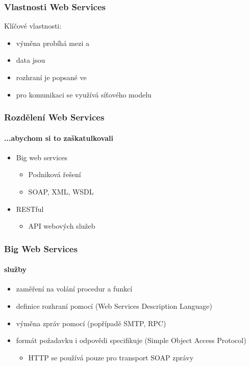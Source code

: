 \documentclass[12pt]{beamer}
\begin{document}
\begin{frame}
  \frametitle{Vlastnosti Web Services}

  \begin{block}{Klíčové vlastnosti:}
    \begin{itemize}
      \item výměna probíhá mezi  a 
      \item data jsou 
      \item rozhraní je popsané ve 
      \item pro komunikaci se využívá  síťového modelu
    \end{itemize}
  \end{block}
\end{frame}

\begin{frame}
  \frametitle{Rozdělení Web Services}
  \framesubtitle{...abychom si to zaškatulkovali}
	\begin{itemize}
      \item {\LARGE Big web services}
		\begin{itemize}
			\item Podniková řešení
			\item SOAP, XML, WSDL
		\end{itemize}
      \vspace{1cm}
      \item {\LARGE RESTful}
		\begin{itemize}
			\item API webových služeb
		\end{itemize}
    \end{itemize}
\end{frame}

\begin{frame}
	\frametitle{Big Web Services}
	\framesubtitle{ služby}
	\begin{itemize}
		\item zaměření na volání procedur a funkcí
		\item definice rozhraní pomocí  (Web Services Description Language)
		\item výměna zpráv pomocí  (popřípadě SMTP, RPC)
		\item formát požadavku i odpovědi specifikuje  (Simple Object Access Protocol)
		\begin{itemize}
			\item HTTP se používá pouze pro transport SOAP zprávy
		\end{itemize}
	\end{itemize}
\end{frame}
\end{document}

